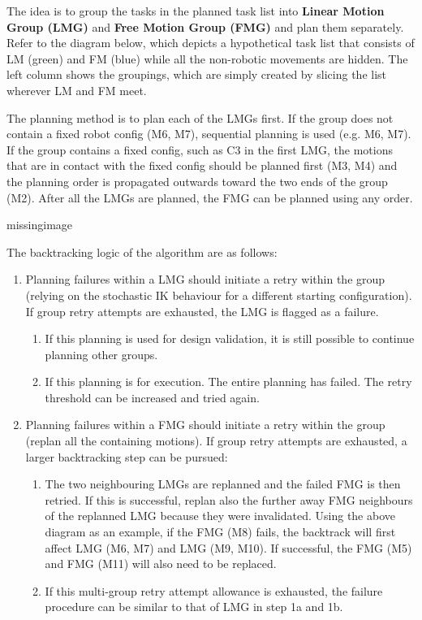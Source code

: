 The idea is to group the tasks in the planned task list into \textbf{Linear Motion Group (LMG)} and \textbf{Free Motion Group (FMG)} and plan them separately. Refer to the diagram below, which depicts a hypothetical task list that consists of LM (green) and FM (blue) while all the non-robotic movements are hidden. The left column shows the groupings, which are simply created by slicing the list wherever LM and FM meet. 

The planning method is to plan each of the LMGs first. If the group does not contain a fixed robot config (M6, M7), sequential planning is used (e.g. M6, M7). If the group contains a fixed config, such as C3 in the first LMG, the motions that are in contact with the fixed config should be planned first (M3, M4) and the planning order is propagated outwards toward the two ends of the group (M2). After all the LMGs are planned, the FMG can be planned using any order. 

missingimage

The backtracking logic of the algorithm are as follows:
\begin{enumerate}
    \item Planning failures within a LMG should initiate a retry within the group (relying on the stochastic IK behaviour for a different starting configuration). If group retry attempts are exhausted, the LMG is flagged as a failure.
    \begin{enumerate}
        \item If this planning is used for design validation, it is still possible to continue planning other groups.
        \item If this planning is for execution. The entire planning has failed. The retry threshold can be increased and tried again.
    \end{enumerate}
    \item Planning failures within a FMG should initiate a retry within the group (replan all the containing motions). If group retry attempts are exhausted, a larger backtracking step can be pursued:
    \begin{enumerate}
        \item The two neighbouring LMGs are replanned and the failed FMG is then retried. If this is successful, replan also the further away FMG neighbours of the replanned LMG because they were invalidated. Using the above diagram as an example, if the FMG (M8) fails, the backtrack will first affect LMG (M6, M7) and LMG (M9, M10). If successful, the FMG (M5) and FMG (M11) will also need to be replaced.
        \item If this multi-group retry attempt allowance is exhausted, the failure procedure can be similar to that of LMG in step 1a and 1b.
    \end{enumerate}
\end{enumerate}

